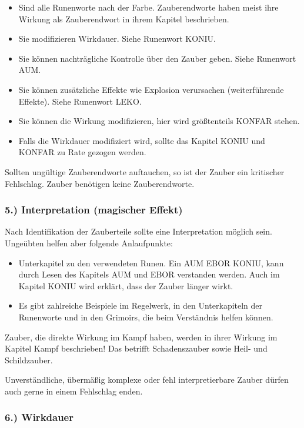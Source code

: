 \documentclass{article}
\begin{document}
\begin{itemize}
\item Sind alle Runenworte nach der Farbe. Zauberendworte haben meist ihre Wirkung als Zauberendwort in ihrem Kapitel beschrieben.
\item Sie modifizieren Wirkdauer. Siehe Runenwort KONIU.
\item Sie können nachträgliche Kontrolle über den Zauber geben. Siehe Runenwort AUM.
\item Sie können zusätzliche Effekte wie Explosion verursachen (weiterführende Effekte). Siehe Runenwort LEKO.
\item Sie können die Wirkung modifizieren, hier wird größtenteils KONFAR stehen.
\item Falls die Wirkdauer modifiziert wird, sollte das Kapitel KONIU und KONFAR zu Rate gezogen werden.
\end{itemize}

Sollten ungültige Zauberendworte auftauchen, so ist der Zauber ein kritischer Fehlschlag. Zauber benötigen keine
Zauberendworte.

\subsubsection{5.) Interpretation (magischer Effekt)}

Nach Identifikation der Zauberteile sollte eine Interpretation möglich sein. Ungeübten helfen aber folgende
Anlaufpunkte:

\begin{itemize}
\item Unterkapitel zu den verwendeten Runen. Ein AUM EBOR KONIU, kann durch Lesen des Kapitels AUM und EBOR verstanden werden. Auch im Kapitel KONIU wird erklärt, dass der Zauber länger wirkt.
\item Es gibt zahlreiche Beispiele im Regelwerk, in den Unterkapiteln der Runenworte und in den Grimoirs, die beim Verständnis helfen können.
\end{itemize}

Zauber, die direkte Wirkung im Kampf haben, werden in ihrer Wirkung im Kapitel Kampf beschrieben! Das betrifft
Schadenszauber sowie Heil- und Schildzauber.

Unverständliche, übermäßig komplexe oder fehl interpretierbare Zauber dürfen auch gerne in einem Fehlschlag enden.

\subsubsection{6.) Wirkdauer}
\end{document}
